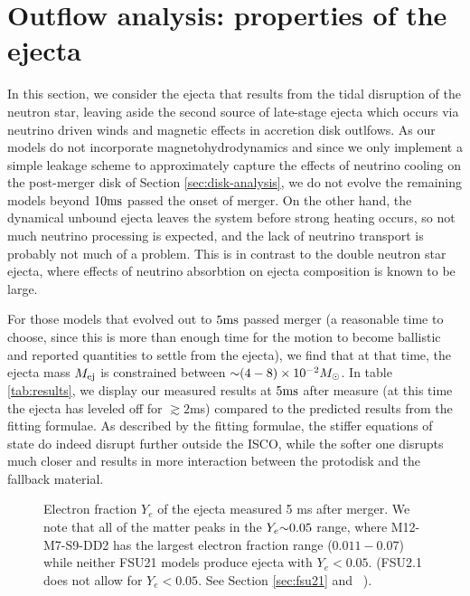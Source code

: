 \section{Outflow analysis: properties of the ejecta}
\label{sec:tail-analysis}

In this section, we consider the ejecta that results from the tidal disruption of the neutron star, leaving aside the second source of late-stage ejecta which occurs via neutrino driven winds and magnetic effects in accretion disk outlfows.  
As our models do not incorporate magnetohydrodynamics and since we only implement a simple leakage scheme to approximately capture the effects of neutrino cooling on the post-merger disk of Section \ref{sec:disk-analysis}, we do not evolve the remaining models beyond $10 {\rm ms}$ passed the onset of merger.
On the other hand, the dynamical unbound ejecta leaves the system before strong heating occurs, so not much neutrino processing is expected, and the lack of neutrino transport is probably not much of a problem.
This is in contrast to the double neutron star ejecta, where effects of neutrino absorbtion on ejecta composition is known to be large.

For those models that evolved out to $5 {\rm ms}$ passed merger 
(a reasonable time to choose, since this is more than enough time for the motion to become ballistic and reported quantities to settle from the ejecta),
we find that at that time, the ejecta mass $M_{\rm ej}$ is constrained between $\mathord{\sim} (4 - 8) \times 10^{-2} M_\odot$.
In table \ref{tab:results}, we display our measured results at $5 {\rm ms}$ after measure (at this time the ejecta has leveled off for $\gtrsim 2$ms) compared to the predicted results from the fitting formulae.  
As described by the fitting formulae, the stiffer equations of state do indeed disrupt further outside the ISCO, while the softer one disrupts much closer and results in more interaction between the protodisk and the fallback material.


\begin{figure}
	\centering
	
	\caption[Composition of the ejecta]{
		Electron fraction $Y_e$ of the ejecta measured 5 ms after merger.  
		We note that all of the matter peaks in the $Y_e \mathord{\sim} 0.05$ range, where M12-M7-S9-DD2 has the largest electron fraction range ($0.011 - 0.07$) while neither FSU21 models produce ejecta with $Y_e < 0.05$. 
		(FSU2.1 does not allow for $Y_e < 0.05$.  See Section \ref{sec:fsu21} and ~\cite{shen2011second}).
	}
	\label{fig:Yehisto}
\end{figure}

